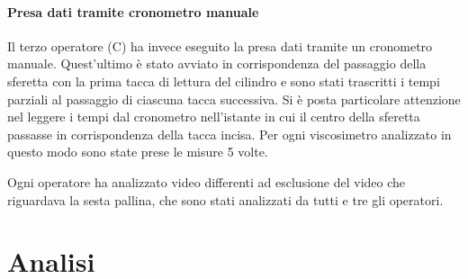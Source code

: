\documentclass[a4paper,11pt,oneside]{article}
\begin{document}
\paragraph{Presa dati tramite cronometro manuale}
Il terzo operatore (C) ha invece eseguito la presa dati tramite un cronometro manuale. Quest'ultimo è stato avviato in corrispondenza del passaggio della sferetta con la prima tacca di lettura del cilindro e sono stati trascritti i tempi parziali al passaggio di ciascuna tacca successiva. Si è posta particolare attenzione nel leggere i tempi dal cronometro nell'istante in cui il centro della sferetta passasse in corrispondenza della tacca incisa. Per ogni viscosimetro analizzato in questo modo sono state prese le misure 5 volte.

Ogni operatore ha analizzato video differenti ad esclusione del video che riguardava la sesta pallina, che sono stati analizzati da tutti e tre gli operatori. 

\section{Analisi}
\end{document}
